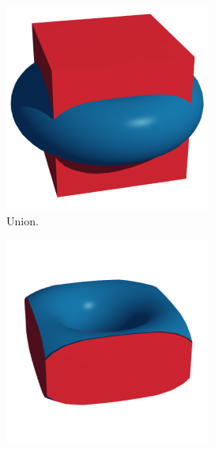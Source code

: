 \documentclass[a4paper,11pt,oneside]{article}
\begin{document}
\begin{figure}[ht]
	\centering
	\begin{subfigure}[b]{0.3\textwidth}
		\centering
		\includegraphics[width=\textwidth]{section1/union.png}
		\caption{Union.}
		\label{sec1:union}
	\end{subfigure}
	\hfill
	\begin{subfigure}[b]{0.3\textwidth}
		\centering
		\includegraphics[width=\textwidth]{section1/intersection.png}

\end{subfigure}
\end{figure}
\end{document}
